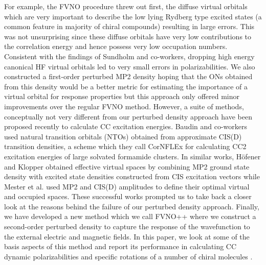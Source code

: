 For example, the FVNO procedure threw out first, the diffuse virtual 
orbitals which are very important to describe the low lying Rydberg type 
excited states (a common feature in majority of chiral compounds) 
resulting in large errors. This was not unsurprising since these diffuse 
orbitals have very low contributions to the correlation energy and hence 
possess very low occupation numbers. Consistent with the findings of Sundholm 
and co-workers\cite{Sundholm13}, dropping high energy canonical HF 
virtual orbitals led to very small errors in polarizabilities. 
We also constructed a first-order perturbed MP2 density hoping that 
the ONs obtained from this density would be a better metric for 
estimating the importance of a virtual orbital 
for response properties but this approach only offered
minor improvements over the regular FVNO method. However, 
a suite of methods, conceptually not very different from our 
perturbed density approach have been proposed recently 
to calculate CC excitation energies. Baudin and co-workers 
used natural transition orbitals (NTOs) obtained from approximate 
CIS(D) transition densities, a scheme which they call CorNFLEx for 
calculating CC2 excitation energies of large solvated formamide 
clusters\cite{}. In similar works, H{\"o}fener and Klopper 
obtained effective virtual spaces by combining MP2 
ground state density with excited state densities constructed from CIS 
excitation vectors\cite{} while Mester et al. used MP2 and CIS(D) amplitudes 
to define their optimal virtual and occupied spaces\cite{Mester17,Mester18}.
These successful works prompted us to take back a closer look at the 
reasons behind the failure of our perturbed density approach. 
Finally, we have developed a new method which we call FVNO++ 
where we construct a second-order perturbed density to 
capture the response of the wavefunction to the external electric 
and magnetic fields. In this paper, we look at some of the basis aspects of 
this method and report its performance in calculating CC dynamic 
polarizabilities and specific rotations of a number of chiral molecules .
